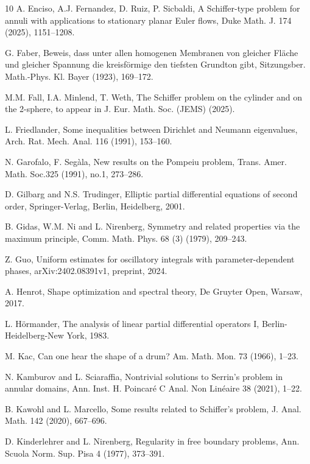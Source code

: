 \documentclass[12pt]{article}
\numberwithin{equation}{section}
\numberwithin{equation}{section}
\begin{document}
\begin{thebibliography}{10}
A. Enciso, A.J. Fernandez, D. Ruiz, P. Sicbaldi, A Schiffer-type problem for annuli with applications to stationary planar Euler flows, Duke Math. J. 174 (2025), 1151--1208.


 G. Faber, Beweis, dass unter allen homogenen Membranen von gleicher Fl\"{a}che und gleicher Spannung die kreisf\"{o}rmige den tiefsten Grundton gibt, Sitzungsber. Math.-Phys. Kl. Bayer (1923), 169--172.

M.M. Fall, I.A. Minlend, T. Weth, The Schiffer problem on the cylinder and on the 2-sphere, to appear in J. Eur.
Math. Soc. (JEMS) (2025).

 L. Friedlander, Some inequalities between Dirichlet and Neumann eigenvalues, Arch. Rat. Mech. Anal. 116 (1991), 153--160.

 N. Garofalo, F. Seg\`{a}la, New results on the Pompeiu problem, Trans. Amer. Math. Soc.325 (1991), no.1, 273--286.

 D. Gilbarg and N.S. Trudinger, Elliptic partial differential equations of second order, Springer-Verlag, Berlin, Heidelberg, 2001.

 B. Gidas, W.M. Ni and L. Nirenberg, Symmetry and related properties via the maximum principle, Comm. Math.
Phys. 68 (3) (1979), 209--243.

 Z. Guo, Uniform estimates for oscillatory integrals with parameter-dependent
phases, arXiv:2402.08391v1, preprint, 2024.

 A. Henrot, Shape optimization and spectral theory, De Gruyter Open, Warsaw, 2017.

 L. H\"{o}rmander, The analysis of linear partial differential operators I, Berlin-Heidelberg-New York, 1983.

 M. Kac, Can one hear the shape of a drum? Am. Math. Mon. 73 (1966), 1--23.

 N. Kamburov and L. Sciaraffia, Nontrivial solutions to Serrin's problem in annular domains, Ann. Inst. H. Poincar\'{e} C Anal. Non Lin\'{e}aire 38 (2021), 1--22.

 B. Kawohl and L. Marcello, Some results related to Schiffer's problem, J. Anal. Math. 142 (2020), 667--696.

 D. Kinderlehrer and L. Nirenberg, Regularity in free boundary problems, Ann. Scuola Norm. Sup. Pisa 4 (1977), 373--391.


\end{thebibliography}
\end{document}
